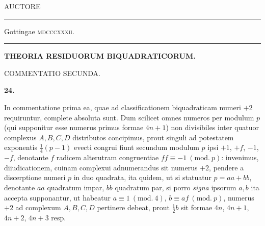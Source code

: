 \clearpage
{}%
\thispagestyle{empty}
\begin{center}
\vspace*{.55in}{\large THEORIA\par}
\vspace{.4in}{\large COMMENTATIO SECUNDA\par}
\vspace{.6in}AUCTORE\par
{}
\vspace{.35in}{\small SOCIETATI REGIAE TRADITA 1831. APR. 15.\par}
\vspace{.55in}\rule{.9\linewidth}{.3pt}\par
{}
{\small Gottingae \textsc{mdcccxxxii}.\par}
\smallskip\rule{.9\linewidth}{.3pt}
\end{center}

\clearpage
{}%

\renewcommand{\BookRunningTitle}{Theoria residuorum biquadraticorum}
\renewcommand{\Article}[1]{\par\medskip\Needspace{4\baselineskip}\pdfbookmark[1]{Art. #1}{paper-five-art-#1}\centerline{\textbf{#1.}}\nobreak\smallskip}
\begin{center}
\textbf{THEORIA RESIDUORUM BIQUADRATICORUM.}\par
\bigskip COMMENTATIO SECUNDA.
\end{center}
\Article{24}
In commentatione prima ea, quae ad classificationem biquadraticam numeri $+2$ requiruntur, complete absoluta sunt. Dum scilicet omnes numeros per modulum $p$ (qui supponitur esse numerus primus formae $4n+1$) non divisibiles inter quatuor complexus $A,B,C,D$ distributos concipimus, prout singuli ad potestatem exponentis $\frac14(p-1)$ evecti congrui fiunt secundum modulum $p$ ipsi $+1$, $+f$, $-1$, $-f$, denotante $f$ radicem alterutram congruentiae $ff\equiv-1\ (\mathrm{mod.}\ p)$: invenimus, diiudicationem, cuinam complexui adnumerandus sit numerus $+2$, pendere a discerptione numeri $p$ in duo quadrata, ita quidem, ut si statuatur $p=aa+bb$, denotante $aa$ quadratum impar, $bb$ quadratum par, si porro \emph{signa} ipsorum $a,b$ ita accepta supponantur, ut habeatur $a\equiv1\ (\mathrm{mod.}\ 4)$, $b\equiv af\ (\mathrm{mod.}\ p)$, numerus $+2$ ad complexum $A,B,C,D$ pertinere debeat, prout $\frac12b$ sit formae $4n$, $4n+1$, $4n+2$, $4n+3$ resp.

